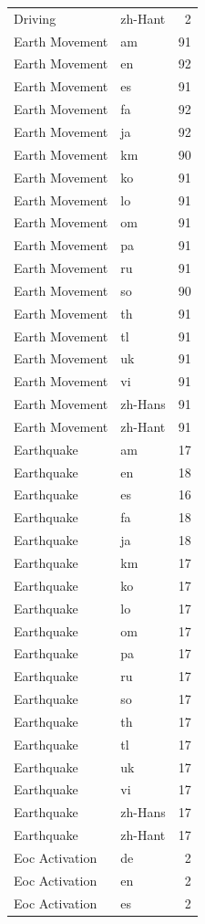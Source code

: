 \begin{longtable}{p{3cm} p{3cm} r}
Driving & zh-Hant & 2 \\
Earth Movement & am & 91 \\
Earth Movement & en & 92 \\
Earth Movement & es & 91 \\
Earth Movement & fa & 92 \\
Earth Movement & ja & 92 \\
Earth Movement & km & 90 \\
Earth Movement & ko & 91 \\
Earth Movement & lo & 91 \\
Earth Movement & om & 91 \\
Earth Movement & pa & 91 \\
Earth Movement & ru & 91 \\
Earth Movement & so & 90 \\
Earth Movement & th & 91 \\
Earth Movement & tl & 91 \\
Earth Movement & uk & 91 \\
Earth Movement & vi & 91 \\
Earth Movement & zh-Hans & 91 \\
Earth Movement & zh-Hant & 91 \\
Earthquake & am & 17 \\
Earthquake & en & 18 \\
Earthquake & es & 16 \\
Earthquake & fa & 18 \\
Earthquake & ja & 18 \\
Earthquake & km & 17 \\
Earthquake & ko & 17 \\
Earthquake & lo & 17 \\
Earthquake & om & 17 \\
Earthquake & pa & 17 \\
Earthquake & ru & 17 \\
Earthquake & so & 17 \\
Earthquake & th & 17 \\
Earthquake & tl & 17 \\
Earthquake & uk & 17 \\
Earthquake & vi & 17 \\
Earthquake & zh-Hans & 17 \\
Earthquake & zh-Hant & 17 \\
Eoc Activation & de & 2 \\
Eoc Activation & en & 2 \\
Eoc Activation & es & 2 \\

\end{longtable}
